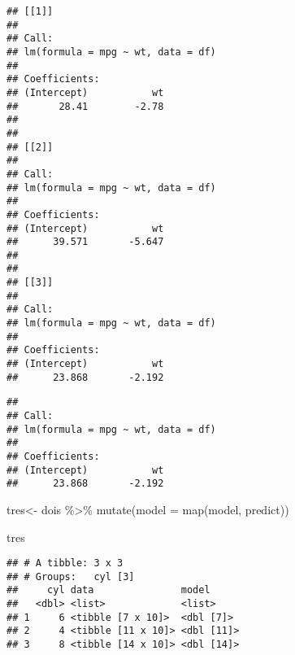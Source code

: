 \documentclass[
]{book}
\newenvironment{Shaded}{\begin{snugshade}}{\end{snugshade}}
\newcommand{\AttributeTok}[1]{\textcolor[rgb]{0.77,0.63,0.00}{#1}}
\newcommand{\DecValTok}[1]{\textcolor[rgb]{0.00,0.00,0.81}{#1}}
\newcommand{\FunctionTok}[1]{\textcolor[rgb]{0.00,0.00,0.00}{#1}}
\newcommand{\NormalTok}[1]{#1}
\newcommand{\OtherTok}[1]{\textcolor[rgb]{0.56,0.35,0.01}{#1}}
\newcommand{\SpecialCharTok}[1]{\textcolor[rgb]{0.00,0.00,0.00}{#1}}
\begin{document}
\begin{Shaded}
\end{Shaded}

\begin{verbatim}
## [[1]]
## 
## Call:
## lm(formula = mpg ~ wt, data = df)
## 
## Coefficients:
## (Intercept)           wt  
##       28.41        -2.78  
## 
## 
## [[2]]
## 
## Call:
## lm(formula = mpg ~ wt, data = df)
## 
## Coefficients:
## (Intercept)           wt  
##      39.571       -5.647  
## 
## 
## [[3]]
## 
## Call:
## lm(formula = mpg ~ wt, data = df)
## 
## Coefficients:
## (Intercept)           wt  
##      23.868       -2.192
\end{verbatim}

\begin{Shaded}
\end{Shaded}

\begin{verbatim}
## 
## Call:
## lm(formula = mpg ~ wt, data = df)
## 
## Coefficients:
## (Intercept)           wt  
##      23.868       -2.192
\end{verbatim}

\begin{Shaded}
\begin{Highlighting}[]
\NormalTok{tres}\OtherTok{\textless{}{-}}\NormalTok{ dois }\SpecialCharTok{\%\textgreater{}\%} 
  \FunctionTok{mutate}\NormalTok{(}\AttributeTok{model =} \FunctionTok{map}\NormalTok{(model, predict))}

\NormalTok{tres}
\end{Highlighting}
\end{Shaded}

\begin{verbatim}
## # A tibble: 3 x 3
## # Groups:   cyl [3]
##     cyl data               model     
##   <dbl> <list>             <list>    
## 1     6 <tibble [7 x 10]>  <dbl [7]> 
## 2     4 <tibble [11 x 10]> <dbl [11]>
## 3     8 <tibble [14 x 10]> <dbl [14]>
\end{verbatim}

\begin{Shaded}
\end{Shaded}
\end{document}

